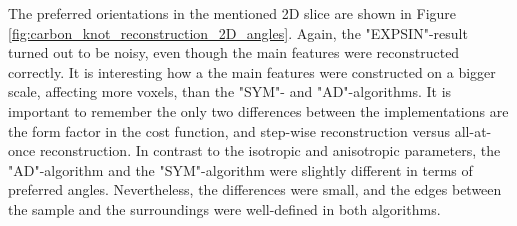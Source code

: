 \clearpage
The preferred orientations in the mentioned 2D slice are shown in Figure \ref{fig:carbon_knot_reconstruction_2D_angles}. %
Again, the "EXPSIN"-result turned out to be noisy, even though the main features were reconstructed correctly.
It is interesting how a the main features were constructed on a bigger scale, affecting more voxels, than the "SYM"- and "AD"-algorithms.
It is important to remember the only two differences between the implementations are the form factor in the cost function, and step-wise reconstruction versus all-at-once reconstruction.
In contrast to the isotropic and anisotropic parameters,
the "AD"-algorithm and the "SYM"-algorithm were slightly different in terms of preferred angles.
Nevertheless, the differences were small, and the edges between the sample and the surroundings were well-defined in both algorithms.

